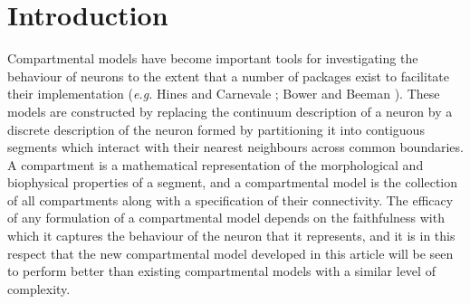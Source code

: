 \section{Introduction}

Compartmental models have become important tools for investigating
the behaviour of neurons to the extent that a number of packages
exist to facilitate their implementation (\emph{e.g.} Hines and
Carnevale \cite{Hines97}; Bower and Beeman \cite{Bower97}). These
models are constructed by replacing the continuum description of a
neuron by a discrete description of the neuron formed by
partitioning it into contiguous segments which interact with their
nearest neighbours across common boundaries. A compartment is a
mathematical representation of the morphological and biophysical
properties of a segment, and a compartmental model is the
collection of all compartments along with a specification of their
connectivity. The efficacy of any formulation of a compartmental
model depends on the faithfulness with which it captures the
behaviour of the neuron that it represents, and it is in this
respect that the new compartmental model developed in this article
will be seen to perform better than existing compartmental models
with a similar level of complexity.

